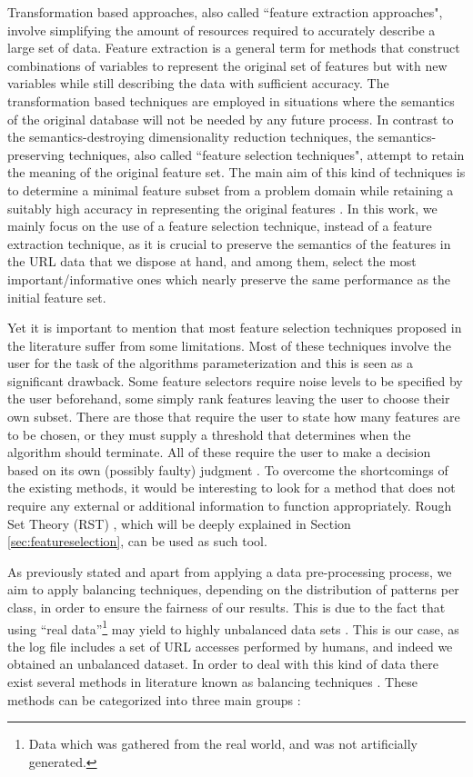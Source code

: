 \documentclass{llncs}
\begin{document}
Transformation based approaches, also called ``feature extraction
approaches", involve simplifying the amount of resources required to
accurately describe a large set of data. Feature extraction is a
general term for methods that construct combinations of variables to
represent the original set of features but with new variables while
still describing the data with sufficient accuracy. The transformation
based techniques are employed in situations where the semantics of the
original database will not be needed by any future process. In
contrast to the semantics-destroying dimensionality reduction
techniques, the semantics-preserving techniques, also called ``feature
selection techniques", attempt to retain the meaning of the original
feature set. The main aim of this kind of techniques is to determine a
minimal feature subset from a problem domain while retaining a
suitably high accuracy in representing the original features
\cite{liu1998feature}. In this work, we mainly focus on the use of a
feature selection technique, instead of a feature extraction
technique, as it is crucial to preserve the semantics of the features
in the URL data that we dispose at hand, and among them, select the
most important/informative ones which nearly preserve  the same
performance as the initial feature set.

Yet it is important to mention that most feature selection techniques
proposed in the literature suffer from some limitations. Most of these
techniques involve the user for the task of the algorithms
parameterization and this is  seen as a significant
drawback. Some feature selectors require noise levels to be specified
by the user beforehand, some simply rank features leaving the user to
choose their own subset. There are those that require the user to
state how many features are to be chosen, or they must supply a
threshold that determines when the algorithm should terminate. All of
these require the user to make a decision based on its own (possibly
faulty) judgment \cite{jensen2005semantics}. To overcome the
shortcomings of the existing methods, it would be interesting to look
for a method that does not require any external or additional
information to function appropriately. Rough Set Theory (RST)
\cite{pawlak2008rough}, which will be deeply explained in Section
\ref{sec:featureselection}, can be used as such tool.

As previously stated and apart from applying a data pre-processing
process, we aim to apply balancing techniques, depending on the
distribution of patterns per class, in order to ensure the fairness of
our results. This is due to the fact that using ``real
data''\footnote{Data which was gathered from the real world, and was
  not artificially generated.} may yield to highly unbalanced data
sets \cite{imbalanced_data_05}. This is our case, as the log file
includes a set of URL accesses performed by humans, and indeed we
obtained an unbalanced dataset. In order to deal with this kind of
data there exist several methods in literature known as balancing
techniques \cite{imbalanced_data_05}. These methods can be categorized
into three main groups \cite{imbalance_techniques_02}:
\end{document}
